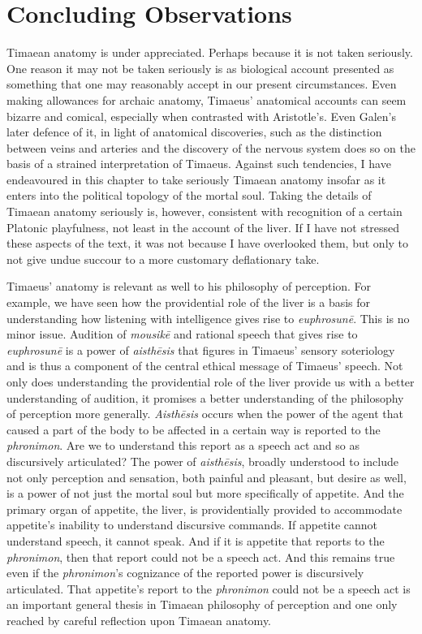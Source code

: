 
\section{Concluding Observations} %
\label{sec:concluding_observations}

Timaean anatomy is under appreciated. Perhaps because it is not taken seriously. One reason it may not be taken seriously is as biological account presented as something that one may reasonably accept in our present circumstances. Even making allowances for archaic anatomy, Timaeus' anatomical accounts can seem bizarre and comical, especially when contrasted with Aristotle's. Even Galen's later defence of it, in light of anatomical discoveries, such as the distinction between veins and arteries and the discovery of the nervous system does so on the basis of a strained interpretation of Timaeus. Against such tendencies, I have endeavoured in this chapter to take seriously Timaean anatomy insofar as it enters into the political topology of the mortal soul. Taking the details of Timaean anatomy seriously is, however, consistent with recognition of a certain Platonic playfulness, not least in the account of the liver. If I have not stressed these aspects of the text, it was not because I have overlooked them, but only to not give undue succour to a more customary deflationary take.

Timaeus' anatomy is relevant as well to his philosophy of perception. For example, we have seen how the providential role of the liver is a basis for understanding how listening with intelligence gives rise to \emph{euphrosunē}. This is no minor issue. Audition of \emph{mousikē} and rational speech that gives rise to \emph{euphrosunē} is a power of \emph{aisthēsis} that figures in Timaeus' sensory soteriology and is thus a component of the central ethical message of Timaeus' speech. Not only does understanding the providential role of the liver provide us with a better understanding of audition, it promises a better understanding of the philosophy of perception more generally. \emph{Aisthēsis} occurs when the power of the agent that caused a part of the body to be affected in a certain way is reported to the \emph{phronimon}. Are we to understand this report as a speech act and so as discursively articulated? The power of \emph{aisthēsis}, broadly understood to include not only perception and sensation, both painful and pleasant, but desire as well, is a power of not just the mortal soul but more specifically of appetite. And the primary organ of appetite, the liver, is providentially provided to accommodate appetite's inability to understand discursive commands. If appetite cannot understand speech, it cannot speak. And if it is appetite that reports to the \emph{phronimon}, then that report could not be a speech act. And this remains true even if the \emph{phronimon}'s cognizance of the reported power is discursively articulated. That appetite's report to the \emph{phronimon} could not be a speech act is an important general thesis in Timaean philosophy of perception and one only reached by careful reflection upon Timaean anatomy.



